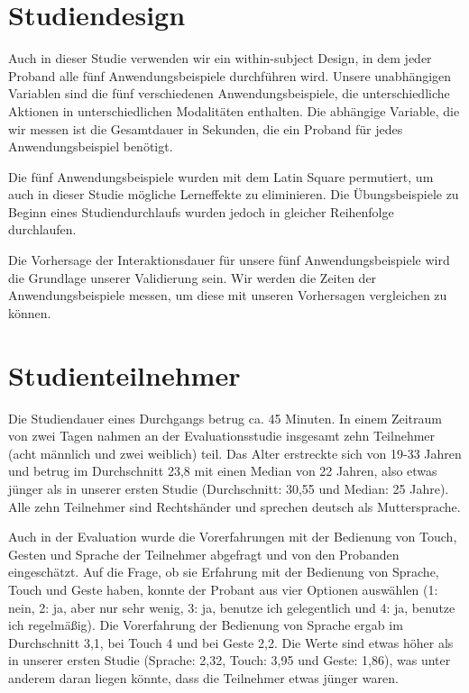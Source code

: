 \section[Studiendesign]{Studiendesign}
Auch in dieser Studie verwenden wir ein within-subject Design, in dem jeder Proband alle fünf Anwendungsbeispiele durchführen wird.
Unsere unabhängigen Variablen sind die fünf verschiedenen Anwendungsbeispiele, die unterschiedliche Aktionen in unterschiedlichen Modalitäten enthalten. 
Die abhängige Variable, die wir messen ist die Gesamtdauer in Sekunden, die ein Proband für jedes Anwendungsbeispiel benötigt. 

Die fünf Anwendungsbeispiele wurden mit dem Latin Square permutiert, um auch in dieser Studie mögliche Lerneffekte zu eliminieren.
Die Übungsbeispiele zu Beginn eines Studiendurchlaufs wurden jedoch in gleicher Reihenfolge durchlaufen. 

Die Vorhersage der Interaktionsdauer für unsere fünf Anwendungsbeispiele wird die Grundlage unserer Validierung sein. 
Wir werden die Zeiten der Anwendungsbeispiele messen, um diese mit unseren Vorhersagen vergleichen zu können. 

\section[Studienteilnehmer]{Studienteilnehmer}
Die Studiendauer eines Durchgangs betrug ca. 45 Minuten. In einem Zeitraum von zwei Tagen nahmen an der Evaluationsstudie insgesamt zehn Teilnehmer (acht männlich und zwei weiblich) teil. Das Alter erstreckte sich von 19-33 Jahren und betrug im Durchschnitt 23,8 mit einen Median von 22 Jahren, also etwas jünger als in unserer ersten Studie (Durchschnitt: 30,55 und Median: 25 Jahre). Alle zehn Teilnehmer sind Rechtshänder und sprechen deutsch als Muttersprache. 

Auch in der Evaluation wurde die Vorerfahrungen mit der Bedienung von Touch, Gesten und Sprache der Teilnehmer abgefragt und von den Probanden eingeschätzt.
Auf die Frage, ob sie Erfahrung mit der Bedienung von Sprache, Touch und Geste haben, konnte der Probant aus vier Optionen auswählen (1: nein, 2: ja, aber nur sehr wenig, 3: ja, benutze ich gelegentlich und 4: ja, benutze ich regelmäßig).
Die Vorerfahrung der Bedienung von Sprache ergab im Durchschnitt 3,1, bei Touch 4 und bei Geste 2,2.
Die Werte sind etwas höher als in unserer ersten Studie (Sprache: 2,32,  Touch: 3,95 und Geste: 1,86), was unter anderem daran liegen könnte, dass die Teilnehmer etwas jünger waren.

